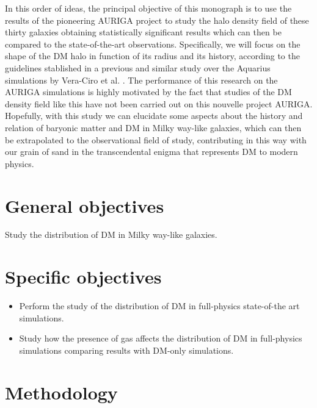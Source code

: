 \documentclass[12pt]{article}
\begin{document}
In this order of ideas, the principal objective of this monograph is to use the results of the pioneering AURIGA project \cite{AURIGA} to study the halo density field of these thirty galaxies obtaining statistically significant results which can then be compared to the state-of-the-art observations. Specifically, we will focus on the shape of the DM halo in function of its radius and its history, according to the guidelines stablished in a previous and similar study over the Aquarius simulations by Vera-Ciro et al. \cite{Vera-Ciro et al 2011}. The performance of this research on the AURIGA simulations is highly motivated by the fact that studies of the DM density field like this have not been carried out on this nouvelle project AURIGA. Hopefully, with this study we can elucidate some aspects about the history and relation of baryonic matter and DM in Milky way-like galaxies, which can then be extrapolated to the observational field of study, contributing in this way with our grain of sand in the transcendental enigma that represents DM to modern physics.\\


\section{General objectives}


Study the distribution of DM in Milky way-like galaxies.

\section{Specific objectives}


\begin{itemize}
	\item Perform the study of the distribution of DM in full-physics state-of-the art simulations.

	\item Study how the presence of gas affects the distribution of DM in full-physics simulations comparing results with DM-only simulations.
\end{itemize}

\section{Methodology}
\end{document}
